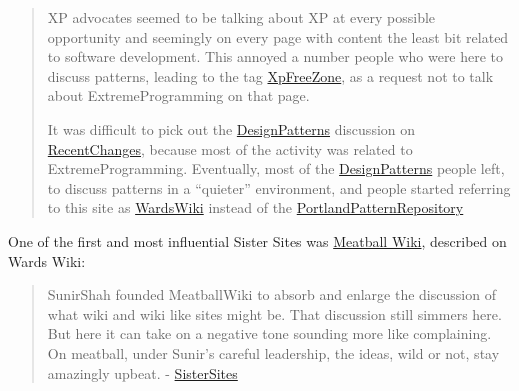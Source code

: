 \begin{quote}
XP advocates seemed to be talking about XP at every possible opportunity
and seemingly on every page with content the least bit related to
software development. This annoyed a number people who were here to
discuss patterns, leading to the tag
\href{http://wiki.c2.com/?XpFreeZone}{XpFreeZone}, as a request not to
talk about ExtremeProgramming on that page.

It was difficult to pick out the
\href{http://wiki.c2.com/?DesignPatterns}{DesignPatterns} discussion on
\href{http://wiki.c2.com/?RecentChanges}{RecentChanges},
because most of the activity was related to ExtremeProgramming.
Eventually, most of the
\href{http://wiki.c2.com/?DesignPatterns}{DesignPatterns} people left,
to discuss patterns in a ``quieter'' environment, and people started
referring to this site as
\href{http://wiki.c2.com/?WardsWiki}{WardsWiki} instead of the
\href{http://wiki.c2.com/?PortlandPatternRepository}{PortlandPatternRepository}
\citep{C2wikiWikiHistory} 
\end{quote}

One of the first and most influential Sister Sites was
\href{http://meatballwiki.org/}{Meatball Wiki}, described on Wards Wiki:

\begin{quote}
SunirShah founded MeatballWiki to absorb and enlarge the discussion of
what wiki and wiki like sites might be. That discussion still simmers
here. But here it can take on a negative tone sounding more like
complaining. On meatball, under Sunir's careful leadership, the ideas,
wild or not, stay amazingly upbeat. -
\href{http://wiki.c2.com/?SisterSites}{SisterSites}
\end{quote}

